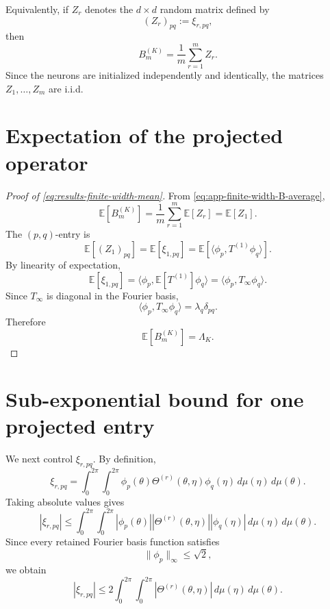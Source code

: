 Equivalently, if \(Z_r\) denotes the \(d\times d\) random matrix defined by
\[
	(Z_r)_{pq}:=\xi_{r,pq},
\]
then
\begin{equation}
	B_m^{(K)}
	=
	\frac1m\sum_{r=1}^m Z_r.
	\label{eq:app-finite-width-B-average}
\end{equation}
Since the neurons are initialized independently and identically, the matrices
\(Z_1,\dots,Z_m\) are i.i.d.

\section{Expectation of the projected operator}
\label{sec:app-finite-width-expectation}

\begin{proof}[Proof of \eqref{eq:results-finite-width-mean}]
	From \eqref{eq:app-finite-width-B-average},
	\[
		\mathbb E[B_m^{(K)}]
		=
		\frac1m\sum_{r=1}^m \mathbb E[Z_r]
		=
		\mathbb E[Z_1].
	\]
	The \((p,q)\)-entry is
	\[
		\mathbb E[(Z_1)_{pq}]
		=
		\mathbb E[\xi_{1,pq}]
		=
		\mathbb E[\langle \phi_p,T^{(1)}\phi_q\rangle].
	\]
	By linearity of expectation,
	\[
		\mathbb E[\xi_{1,pq}]
		=
		\langle \phi_p,\mathbb E[T^{(1)}]\phi_q\rangle
		=
		\langle \phi_p,T_\infty\phi_q\rangle.
	\]
	Since \(T_\infty\) is diagonal in the Fourier basis,
	\[
		\langle \phi_p,T_\infty\phi_q\rangle
		=
		\lambda_q\delta_{pq}.
	\]
	Therefore
	\[
		\mathbb E[B_m^{(K)}]=\Lambda_K.
	\]
\end{proof}

\section{Sub-exponential bound for one projected entry}
\label{sec:app-finite-width-subexp}

We next control \(\xi_{r,pq}\). By definition,
\begin{equation}
	\xi_{r,pq}
	=
	\int_0^{2\pi}\int_0^{2\pi}
	\phi_p(\theta)
	\Theta^{(r)}(\theta,\eta)
	\phi_q(\eta)
	\,d\mu(\eta)\,d\mu(\theta).
	\label{eq:app-finite-width-xi-integral}
\end{equation}
Taking absolute values gives
\[
	|\xi_{r,pq}|
	\le
	\int_0^{2\pi}\int_0^{2\pi}
	|\phi_p(\theta)|
	|\Theta^{(r)}(\theta,\eta)|
	|\phi_q(\eta)|
	\,d\mu(\eta)\,d\mu(\theta).
\]
Since every retained Fourier basis function satisfies
\[
	\|\phi_p\|_\infty\le \sqrt2,
\]
we obtain
\[
	|\xi_{r,pq}|
	\le
	2
	\int_0^{2\pi}\int_0^{2\pi}
	|\Theta^{(r)}(\theta,\eta)|
	\,d\mu(\eta)\,d\mu(\theta).
\]

